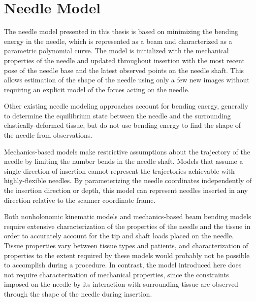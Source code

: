 \chapter{Needle Model}
\label{sec:needlemodel} %

The needle model presented in this thesis is based on minimizing the bending energy in the needle, which is represented as a beam and characterized as a parametric polynomial curve. The model is initialized with the mechanical properties of the needle and updated throughout insertion with the most recent pose of the needle base and the latest observed points on the needle shaft. This allows estimation of the shape of the needle using only a few new images without requiring an explicit model of the forces acting on the needle.

Other existing needle modeling approaches account for bending energy, generally to determine the equilibrium state between the needle and the surrounding elastically-deformed tissue\cite{roesthuis_modeling_2015, misra_mechanics_2010, abayazid_integrating_2013}, but do not use bending energy to find the shape of the needle from observations.

Mechanics-based models make restrictive assumptions about the trajectory of the needle by limiting the number bends in the needle shaft\cite{abayazid_integrating_2013}. Models that assume a single direction of insertion\cite{roesthuis_mechanics-based_2012, abayazid_integrating_2013} cannot represent the trajectories achievable with highly-flexible needles. By parameterizing the needle coordinates independently of the insertion direction or depth, this model can represent needles inserted in any direction relative to the scanner coordinate frame.

Both nonholonomic kinematic models\cite{webster_nonholonomic_2006, reed_modeling_2009, swensen_torsional_2014} and mechanics-based beam bending models\cite{roesthuis_mechanics-based_2012, abayazid_integrating_2013} require extensive characterization of the properties of the needle and the tissue in order to accurately account for the tip and shaft loads placed on the needle. Tissue properties vary between tissue types and patients, and characterization of properties to the extent required by these models would probably not be possible to accomplish during a procedure. In contrast, the model introduced here does not require characterization of mechanical properties, since the constraints imposed on the needle by its interaction with surrounding tissue are observed through the shape of the needle during insertion.

